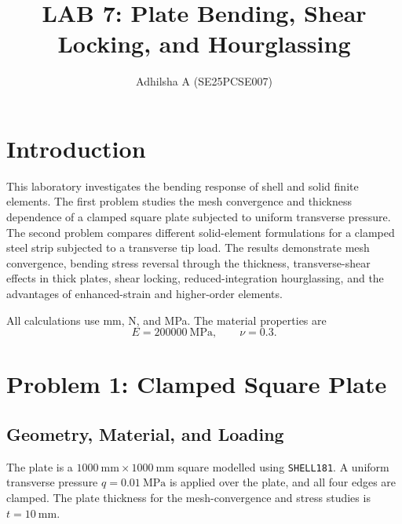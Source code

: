 
\title{LAB 7: Plate Bending, Shear Locking, and Hourglassing}

\author{Adhilsha A (SE25PCSE007)}
\maketitle

\tableofcontents

\section{Introduction}

This laboratory investigates the bending response of shell and solid finite
elements. The first problem studies the mesh convergence and thickness
dependence of a clamped square plate subjected to uniform transverse pressure.
The second problem compares different solid-element formulations for a
clamped steel strip subjected to a transverse tip load. The results
demonstrate mesh convergence, bending stress reversal through the thickness,
transverse-shear effects in thick plates, shear locking, reduced-integration
hourglassing, and the advantages of enhanced-strain and higher-order
elements.

All calculations use mm, N, and MPa. The material properties are
\[
E=\SI{200000}{\mega\pascal},\qquad \nu=0.3.
\]

\section{Problem 1: Clamped Square Plate}

\subsection{Geometry, Material, and Loading}

The plate is a \(\SI{1000}{\milli\metre}\times\SI{1000}{\milli\metre}\)
square modelled using \texttt{SHELL181}. A uniform transverse pressure
\(q=\SI{0.01}{\mega\pascal}\) is applied over the plate, and all four edges
are clamped. The plate thickness for the mesh-convergence and stress studies
is \(t=\SI{10}{\milli\metre}\).

